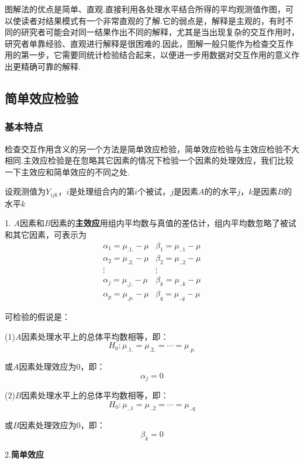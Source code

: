 图解法的优点是简单、直观.直接利用各处理水平结合所得的平均观测值作图，可以使读者对结果模式有一个非常直观的了解.它的弱点是，解释是主观的，有时不同的研究者可能会对同一结果作出不同的解释，尤其是当出现复杂的交互作用时，研究者单靠经验、直观进行解释是很困难的.因此，图解一般只能作为检查交互作用的第一步，它需要同统计检验结合起来，以便进一步用数据对交互作用的意义作出更精确可靠的解释.

\subsection{简单效应检验}
\subsubsection{基本特点}

检查交互作用含义的另一个方法是简单效应检验，简单效应检验与主效应检验不大相同.主效应检验是在忽略其它因素的情况下检验一个因素的处理效应，我们比较一下主效应和简单效应的不同之处.

设观测值为$Y_{ijk}$，$i$是处理组合内的第$i$个被试，$j$是因素$A$的的水平$j$，$k$是因素$B$的水平$k$

1. $A$因素和$B$因素的\textbf{主效应}用组内平均数与真值的差估计，组内平均数忽略了被试和其它因素，可表示为
\[ \begin{array}{cc}
    \alpha _1 = \mu _{.1.} - \mu    &    \beta _1 = \mu _{..1} - \mu\\ 
    \alpha _2 = \mu _{.2.} - \mu    &    \beta _2 = \mu _{..2} - \mu\\
    \vdots                          &     \vdots \\
    \alpha _j = \mu _{.j.} - \mu    &    \beta _k = \mu _{..k} - \mu\\
    
    \alpha _p = \mu _{.p.} - \mu    &    \beta _q = \mu _{..q} - \mu
\end{array}\]

可检验的假说是：

(1)$A$因素处理水平上的总体平均数相等，即：
\[H_0 : \mu _{.1.} = \mu _{.2.} = \cdots = \mu _{.p.}\]

或$A$因素处理效应为0，即：
\[ \alpha _j = 0 \]

(2)$B$因素处理水平上的总体平均数相等，即：
\[ H_0 : \mu _{..1} = \mu _{..2} = \cdots = \mu _{..q} \]

或$B$因素处理效应为0，即：
\[ \beta _k =0 \]

2.\textbf{简单效应}


